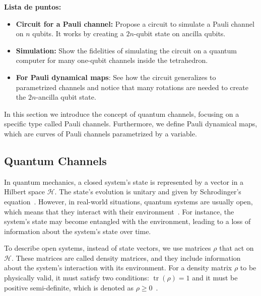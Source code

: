 \documentclass[10pt,letterpaper]{article} %
\DeclareMathOperator{\tr}{tr}
\begin{document}
\textbf{Lista de puntos:}
\begin{itemize}
\item \textbf{Circuit for a Pauli channel:}  Propose a circuit to simulate a Pauli channel on $n$ qubits. It works by creating a $2n$-qubit state on ancilla qubits.
\item \textbf{Simulation:} Show the fidelities of simulating the circuit on a quantum computer for many one-qubit channels inside the tetrahedron.
\item \textbf{For Pauli dynamical maps}: See how the circuit generalizes to parametrized channels and notice that many rotations are needed to create the $2n$-ancilla qubit state. \\
\end{itemize}

In this section  we introduce the
concept of quantum channels, focusing on a specific type called Pauli channels.
Furthermore, we define Pauli dynamical maps, which
are curves of Pauli channels parametrized by a variable.
\subsection*{Quantum Channels} \label{subsec: Quantum Channels} %



In quantum mechanics, a closed system's state is represented by a vector in a
Hilbert space $\mathcal{H}$.  The state's evolution is unitary and given by
Schrodinger's equation~\cite{Rieffel}.  However, in real-world situations,
quantum systems are usually open, which means that they interact with their
environment~\cite{Breuer}.  For instance, the system's state may become
entangled with the environment, leading to a loss of information about the
system's state over time.

To describe open systems, instead of state vectors,
we use matrices $\rho$ that act on $\mathcal{H}$.
These matrices are called density matrices, and they include information about the system's interaction with its environment. 
For a density matrix $\rho$ to be physically valid, 
it must satisfy two conditions: $\tr(\rho) = 1$ and it must be positive semi-definite,
which is denoted as $\rho \geq 0$~\cite{chuangbook}.
\end{document}
